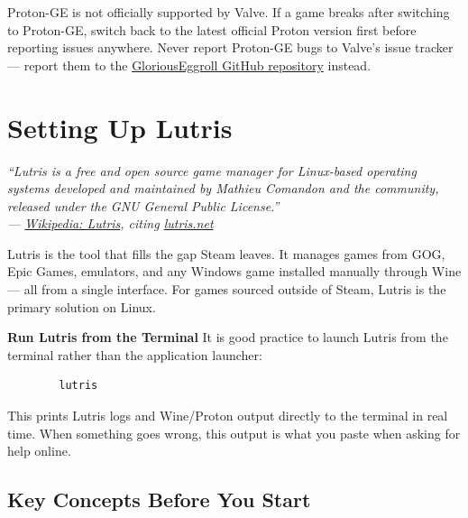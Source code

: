 \documentclass{article}
\begin{document}
\begin{tcolorbox}[arc=12pt, outer arc=10pt,
	colback=red!5!white, colframe=red!60!black,
	title=\textbf{Warning}]
	Proton-GE is not officially supported by Valve. If a game breaks after
	switching to Proton-GE, switch back to the latest official Proton version
	first before reporting issues anywhere. Never report Proton-GE bugs to
	Valve's issue tracker --- report them to the
	\href{https://github.com/GloriousEggroll/proton-ge-custom}{GloriousEggroll
		GitHub repository} instead.
\end{tcolorbox}

\newpage
\section{Setting Up Lutris}

\begin{mdframed}[linewidth=1.5pt, linecolor=black!50, topline=true, bottomline=true,
	leftline=false, rightline=false, backgroundcolor=black!3]
	\small\itshape
	``Lutris is a free and open source game manager for Linux-based operating systems
	developed and maintained by Mathieu Comandon and the community, released under the
	GNU General Public License.''\\[4pt]
	\normalfont\small ---
	\href{https://en.wikipedia.org/wiki/Lutris}{Wikipedia: Lutris},
	citing \href{https://lutris.net}{lutris.net}
\end{mdframed}

\noindent Lutris is the tool that fills the gap Steam leaves. It manages games from
GOG, Epic Games, emulators, and any Windows game installed manually through Wine ---
all from a single interface. For games sourced outside of Steam, Lutris is the
primary solution on Linux.

\begin{callout}{\textbf{Run Lutris from the Terminal}}
	It is good practice to launch Lutris from the terminal rather than the application
	launcher:
	\begin{verbatim}
		lutris
	\end{verbatim}
	This prints Lutris logs and Wine/Proton output directly to the terminal in real
	time. When something goes wrong, this output is what you paste when asking for
	help online.
\end{callout}

\subsection{Key Concepts Before You Start}
\end{document}
